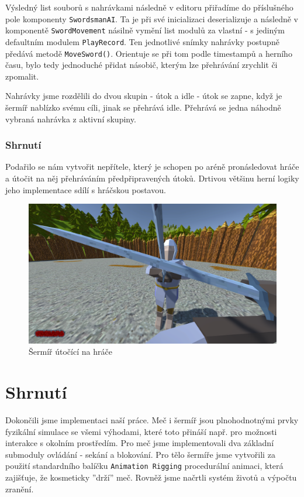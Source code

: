 \bigbreak

Výsledný list souborů s nahrávkami následně v editoru přiřadíme do příslušného pole komponenty \texttt{SwordsmanAI}. Ta je při své inicializaci deserializuje a následně v komponentě \texttt{SwordMovement} násilně vymění list modulů za vlastní - s jediným defaultním modulem \texttt{PlayRecord}. Ten jednotlivé snímky nahrávky postupně předává metodě \texttt{MoveSword()}. Orientuje se při tom podle timestampů a herního času, bylo tedy jednoduché přidat násobič, kterým lze přehrávání zrychlit či zpomalit.

Nahrávky jsme rozdělili do dvou skupin - útok a idle - útok se zapne, když je šermíř nablízko svému cíli, jinak se přehrává idle. Přehrává se jedna náhodně vybraná nahrávka z aktivní skupiny.

\subsubsection*{Shrnutí}

Podařilo se nám vytvořit nepřítele, který je schopen po aréně pronásledovat hráče a útočit na něj přehráváním předpřipravených útoků. Drtivou většinu herní logiky jeho implementace sdílí s hráčskou postavou.

\begin{figure}[h!]\centering
  \center
  \includegraphics[width=140mm]{../img/demogameFight.png}
  \caption{Šermíř útočící na hráče}
  \label{obr05:demogameFight}
\end{figure} 

\section{Shrnutí}

Dokončili jsme implementaci naší práce. Meč i šermíř jsou plnohodnotnými prvky fyzikální simulace se všemi výhodami, které toto přináší např. pro možnosti interakce s okolním prostředím. Pro meč jsme implementovali dva základní submoduly ovládání - sekání a blokování. Pro tělo šermíře jsme vytvořili za použití standardního balíčku \texttt{Animation Rigging} \cite{AnimationRigging} procedurální animaci, která zajišťuje, že kosmeticky ''drží'' meč. Rovněž jsme načrtli systém životů a výpočtu zranění.

